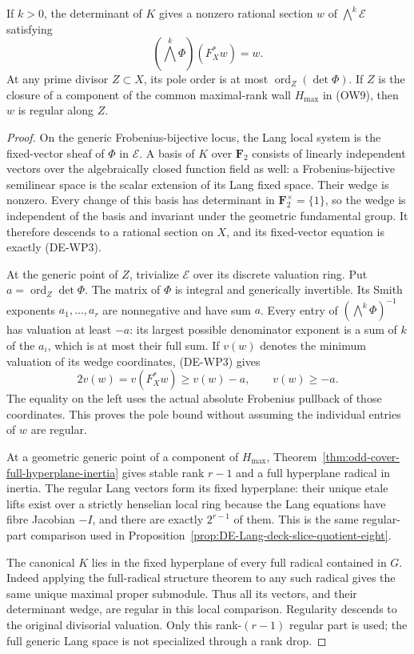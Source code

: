 \begin{lemma}
\label{lem:DE-Lang-wedge-pole-bound}
If \(k>0\), the determinant of \(K\) gives a nonzero rational
section
\(w\) of \(\bigwedge^k\mathcal E\) satisfying
\[
                 (\bigwedge^k\Phi)(F_X^*w)=w.
 \tag{DE-WP3}
\]
At any prime divisor \(Z\subset X\), its pole order is at most
\(\operatorname{ord}_Z(\det\Phi)\).
If \(Z\) is the closure of a component of the common maximal-rank
wall \(H_{\max}\) in (OW9), then \(w\) is regular along \(Z\).
\end{lemma}
\begin{proof}
On the generic Frobenius-bijective locus, the Lang local system is
the fixed-vector sheaf of \(\Phi\) in \(\mathcal E\).
A basis of \(K\) over \(\mathbf F_2\) consists of linearly
independent vectors over the algebraically closed function field
as well: a Frobenius-bijective semilinear space is the scalar
extension of its Lang fixed space. Their wedge is nonzero.
Every change of this basis has determinant in
\(\mathbf F_2^\times=\{1\}\), so the wedge is independent of
the basis and invariant under the geometric fundamental group.
It therefore descends to a rational section on \(X\), and its
fixed-vector equation is exactly (DE-WP3).

At the generic point of \(Z\), trivialize \(\mathcal E\) over
its discrete valuation ring. Put \(a=\operatorname{ord}_Z\det\Phi\).
The matrix of \(\Phi\) is integral and generically invertible.
Its Smith exponents \(a_1,\ldots,a_r\) are nonnegative and have
sum \(a\). Every entry of
\((\bigwedge^k\Phi)^{-1}\) has valuation at least \(-a\): its
largest possible denominator exponent is a sum of \(k\) of the
\(a_i\), which is at most their full sum. If \(v(w)\) denotes
the minimum valuation of its wedge coordinates, (DE-WP3) gives
\[
       2v(w)=v(F_X^*w)
             \ge v(w)-a,
       \qquad v(w)\ge-a.
 \tag{DE-WP4}
\]
The equality on the left uses the actual absolute Frobenius
pullback of those coordinates. This proves the pole bound without
assuming the individual entries of \(w\) are regular.

At a geometric generic point of a component of \(H_{\max}\),
Theorem~\ref{thm:odd-cover-full-hyperplane-inertia} gives stable
rank \(r-1\) and a full hyperplane radical in inertia. The
regular Lang vectors form its fixed hyperplane: their unique
etale lifts exist over a strictly henselian local ring because
the Lang equations have fibre Jacobian \(-I\), and there are
exactly \(2^{r-1}\) of them. This is the same regular-part
comparison used in Proposition~\ref{prop:DE-Lang-deck-slice-quotient-eight}.

The canonical \(K\) lies in the fixed hyperplane of every full
radical contained in \(G\). Indeed applying the full-radical
structure theorem to any such radical gives the same unique
maximal proper submodule. Thus all its vectors, and their
determinant wedge, are regular in this local comparison.
Regularity descends to the original divisorial valuation.
Only this rank-\((r-1)\) regular part is used; the full generic
Lang space is not specialized through a rank drop.
\end{proof}

